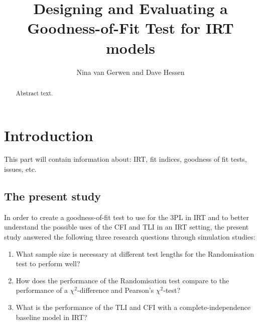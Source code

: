 \documentclass[Royal,sageapa,times, doublespace]{sagej}
\begin{document}

\title{Designing and Evaluating a Goodness-of-Fit Test for IRT models}

\author{Nina van Gerwen  and Dave Hessen}




\begin{abstract}
Abstract text.
\end{abstract}


\maketitle

\section{Introduction}
This part will contain information about: IRT, fit indices, goodness of fit tests, issues, etc.
\subsection{The present study}
In order to create a goodness-of-fit test to use for the 3PL in IRT and to better understand the possible uses of the CFI and TLI in an IRT setting, the present study answered the following three research questions through simulation studies:
\begin{enumerate}
\item{What sample size is necessary at different test lengths for the Randomisation test to perform well?}
\item{How does the performance of the Randomisation test compare to the performance of a $\chi^2$-difference and Pearson's $\chi^2$-test?}
\item{What is the performance of the TLI and CFI with a complete-independence baseline model in IRT?}
\end{enumerate}

\section{Methods}
\end{document}
